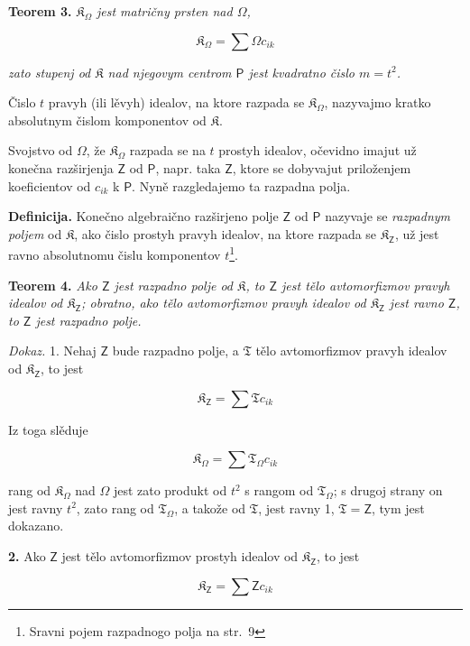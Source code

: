 \documentclass[11pt]{article}
\newcommand{\srcfn}[2]{\footnote{#2}}
\begin{document}
\textbf{Teorem 3.} \emph{\(\mathfrak K_\Omega\) jest matričny prsten nad \(\Omega\),}

\[
\mathfrak K_\Omega=\sum\Omega c_{ik}
\]

\emph{zato stupenj od \(\mathfrak K\) nad njegovym centrom \(\mathsf P\) jest kvadratno čislo \(m=t^2\).}

Čislo \(t\) pravyh (ili lěvyh) idealov, na ktore razpada se \(\mathfrak K_\Omega\), nazyvajmo kratko absolutnym čislom komponentov od \(\mathfrak K\).

Svojstvo od \(\Omega\), že \(\mathfrak K_\Omega\) razpada se na \(t\) prostyh idealov, očevidno imajut už konečna razširjenja \(\mathsf{Z}\) od \(\mathsf P\), napr. taka \(\mathsf{Z}\), ktore se dobyvajut priloženjem koeficientov od \(c_{ik}\) k \(\mathsf P\). Nyně razgledajemo ta razpadna polja.

\textbf{Definicija.} Konečno algebraično razširjeno polje \(\mathsf{Z}\) od \(\mathsf P\) nazyvaje se \emph{razpadnym poljem} od \(\mathfrak K\), ako čislo prostyh pravyh idealov, na ktore razpada se \(\mathfrak K_{\mathsf{Z}}\), už jest ravno absolutnomu čislu komponentov \(t\)\srcfn{1}{Sravni pojem razpadnogo polja na str.~9}.

\textbf{Teorem 4.} \emph{Ako \(\mathsf{Z}\) jest razpadno polje od \(\mathfrak K\), to \(\mathsf{Z}\) jest tělo avtomorfizmov pravyh idealov od \(\mathfrak K_{\mathsf{Z}}\); obratno, ako tělo avtomorfizmov pravyh idealov od \(\mathfrak K_{\mathsf{Z}}\) jest ravno \(\mathsf{Z}\), to \(\mathsf{Z}\) jest razpadno polje.}

\emph{Dokaz.} 1. Nehaj \(\mathsf{Z}\) bude razpadno polje, a \(\mathfrak T\) tělo avtomorfizmov pravyh idealov od \(\mathfrak K_{\mathsf{Z}}\), to jest

\[
\mathfrak K_{\mathsf{Z}}=\sum\mathfrak T c_{ik}
\]

Iz toga slěduje

\[
\mathfrak K_\Omega=\sum\mathfrak T_\Omega c_{ik}
\]

rang od \(\mathfrak K_\Omega\) nad \(\Omega\) jest zato produkt od \(t^2\) s rangom od \(\mathfrak T_\Omega\); s drugoj strany on jest ravny \(t^2\), zato rang od \(\mathfrak T_\Omega\), a takože od \(\mathfrak T\), jest ravny 1, \(\mathfrak T=\mathsf{Z}\), tym jest dokazano.

\textbf{2.} Ako \(\mathsf{Z}\) jest tělo avtomorfizmov prostyh idealov od \(\mathfrak K_{\mathsf{Z}}\), to jest

\[
\mathfrak K_{\mathsf{Z}}=\sum\mathsf Zc_{ik}
\]
\end{document}
